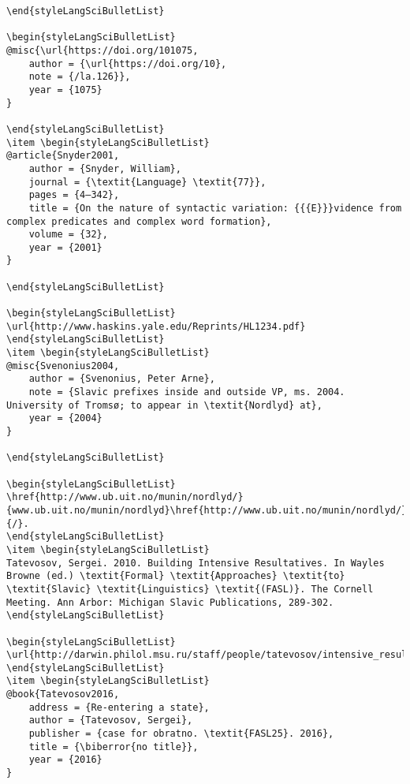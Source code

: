 \documentclass[output=paper,modfonts,nonflat,
 hidelinks
]{langsci/langscibook}
\begin{document}
\begin{verbatim}
\end{styleLangSciBulletList}

\begin{styleLangSciBulletList}
@misc{\url{https://doi.org/101075,
	author = {\url{https://doi.org/10},
	note = {/la.126}},
	year = {1075}
}

\end{styleLangSciBulletList}
\item \begin{styleLangSciBulletList}
@article{Snyder2001,
	author = {Snyder, William},
	journal = {\textit{Language} \textit{77}},
	pages = {4–342},
	title = {On the nature of syntactic variation: {{{E}}}vidence from complex predicates and complex word formation},
	volume = {32},
	year = {2001}
}

\end{styleLangSciBulletList}

\begin{styleLangSciBulletList}
\url{http://www.haskins.yale.edu/Reprints/HL1234.pdf}
\end{styleLangSciBulletList}
\item \begin{styleLangSciBulletList}
@misc{Svenonius2004,
	author = {Svenonius, Peter Arne},
	note = {Slavic prefixes inside and outside VP, ms. 2004. University of Tromsø; to appear in \textit{Nordlyd} at},
	year = {2004}
}

\end{styleLangSciBulletList}

\begin{styleLangSciBulletList}
\href{http://www.ub.uit.no/munin/nordlyd/}{www.ub.uit.no/munin/nordlyd}\href{http://www.ub.uit.no/munin/nordlyd/}{/}.
\end{styleLangSciBulletList}
\item \begin{styleLangSciBulletList}
Tatevosov, Sergei. 2010. Building Intensive Resultatives. In Wayles Browne (ed.) \textit{Formal} \textit{Approaches} \textit{to} \textit{Slavic} \textit{Linguistics} \textit{(FASL)}. The Cornell Meeting. Ann Arbor: Michigan Slavic Publications, 289-302.
\end{styleLangSciBulletList}

\begin{styleLangSciBulletList}
\url{http://darwin.philol.msu.ru/staff/people/tatevosov/intensive_resultatives.pdf}
\end{styleLangSciBulletList}
\item \begin{styleLangSciBulletList}
@book{Tatevosov2016,
	address = {Re-entering a state},
	author = {Tatevosov, Sergei},
	publisher = {case for obratno. \textit{FASL25}. 2016},
	title = {\biberror{no title}},
	year = {2016}
}


\end{verbatim}
\end{document}
